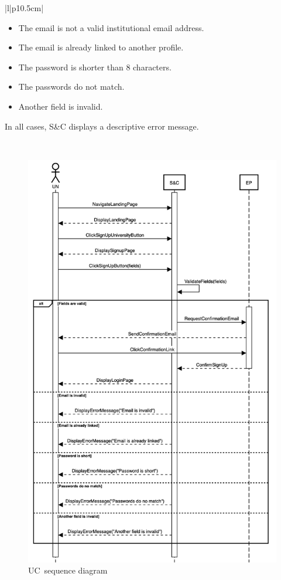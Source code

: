 \begin{longtable}{|l|p{10.5cm}|}
\begin{minipage}[t]{\linewidth}
\begin{itemize}[leftmargin=*, label=\tiny\textbullet]
                \item The email is not a valid institutional email address.
                \item The email is already linked to another profile.
                \item The password is shorter than 8 characters.
                \item The passwords do not match.
                \item Another field is invalid.
            \end{itemize}
            In all cases, S\&C displays a descriptive error message.
            \vspace{10pt}
        \end{minipage} \\ \hline
\caption{Use case \theuc}
\end{longtable}

\begin{figure}
    \centering
    \includegraphics[width=13cm]{images/sequence-diagrams/university-signs-up.png}
    \caption{UC\theuc\ sequence diagram}
\end{figure}

